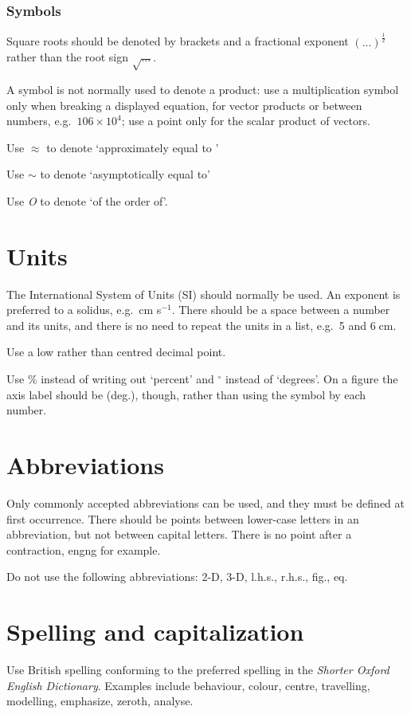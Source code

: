 \subsubsection{Symbols}
Square roots should be denoted by brackets and a fractional exponent
$(...)^{\frac{1}{2}}$ rather than the root sign $\sqrt{...}$.

A symbol is not normally used to denote a product: use a multiplication
symbol only when breaking a displayed equation, for vector products or
between numbers, e.g.\ $106 \times 10^{4}$; use a point only for the scalar
product of vectors.

Use $\approx$ to denote `approximately equal to '

Use $\sim$ to denote `asymptotically equal to'

Use {\it O} to denote `of the order of'.

\section{Units}

The International System of Units (SI) should normally be used.
An exponent is preferred to a solidus, e.g.\ cm s$^{-1}$. There should be
a space between a number and its units, and there is no need to repeat the
units in a list, e.g.\ 5 and 6$\;$cm.

Use a low rather than centred decimal point.

Use \% instead of writing out `percent' and $^{\circ}$  instead of `degrees'.
On a figure the axis label should be (deg.), though, rather than using the
symbol by each number.

\section{Abbreviations}

Only commonly accepted abbreviations can be used, and they must be
defined at first occurrence. There should be points between lower-case
letters in an abbreviation, but not between capital letters. There is no
point after a contraction, engng for example.

Do not use the following abbreviations: 2-D, 3-D, l.h.s., r.h.s., fig., eq.

\section{Spelling and capitalization}

Use British spelling conforming to the preferred spelling in the {\em
Shorter Oxford English Dictionary}. Examples include behaviour, colour,
centre, travelling, modelling, emphasize, zeroth, analyse.

